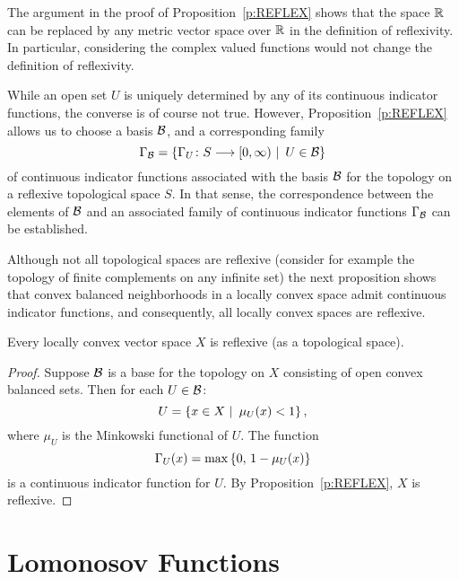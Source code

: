 \smallskip

\begin{rem}
The argument in the proof of Proposition~\ref{p:REFLEX} shows that the space
$\mathbb R$ can be replaced by any metric vector space over $\mathbb R$ in the
definition of reflexivity. In particular, considering the complex valued
functions would not change the definition of reflexivity.
\end{rem}

\smallskip
\goodbreak

\begin{rem}
While an open set $U$ is uniquely determined by any of its continuous
indicator functions, the converse is of course not true. However,
Proposition~\ref{p:REFLEX} allows us to choose a basis $\cal B$, and a
corresponding family
\[ \Gamma_{\cal B}=\left\{\Gamma_U\colon S\longrightarrow [0,\infty)
           \,\,|\,\,\, U\in\cal B\right\} \]
of continuous indicator functions associated with the basis $\cal B$ for the
topology on a reflexive topological space $S$. In that sense, the
correspondence between the elements of $\cal B$ and an associated family of
continuous indicator functions $\Gamma_{\cal B}$ can be established.
\end{rem}

\medskip

Although not all topological spaces are reflexive (consider for example the
topology of finite complements on any infinite set) the next proposition
shows that convex balanced neighborhoods in a locally convex space admit
continuous indicator functions, and consequently, all locally convex spaces
are reflexive.

\smallskip

\begin{prop}
Every locally convex vector space $X$ is reflexive (as a topological space).
\end{prop}

\begin{proof}
Suppose $\cal B$ is a base for the topology on $X$ consisting of open convex
balanced sets. Then for each $U\in\cal{B}$:
\[ U = \left\{x \in X \,\,|\,\,\, \mu_U(x) < 1\right\}, \]
where $\mu_U$ is the Minkowski functional of $U$. The function
\[ \Gamma_U(x) =\max\left\{0, \, 1-\mu_U(x)\right\} \]
is a continuous indicator function for $U$. By Proposition~\ref{p:REFLEX},
$X$ is reflexive.
\end{proof}

\goodbreak
\section{Lomonosov Functions}

